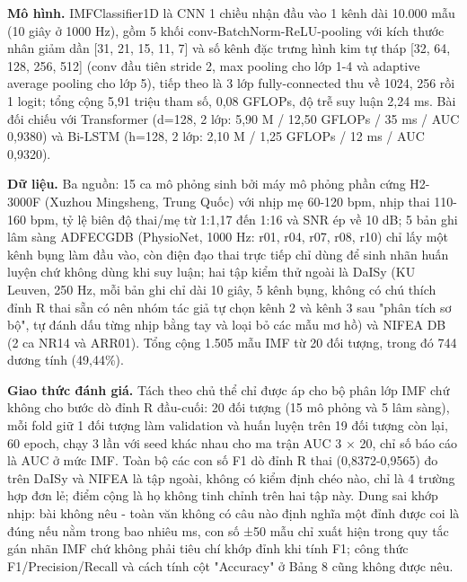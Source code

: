 \documentclass[12pt,a4paper]{article}
\begin{document}
\noindent \textbf{Mô hình.} IMFClassifier1D là CNN 1 chiều nhận đầu vào 1 kênh dài 10.000 mẫu (10 giây ở 1000 Hz), gồm 5 khối conv-BatchNorm-ReLU-pooling với kích thước nhân giảm dần [31, 21, 15, 11, 7] và số kênh đặc trưng hình kim tự tháp [32, 64, 128, 256, 512] (conv đầu tiên stride 2, max pooling cho lớp 1-4 và adaptive average pooling cho lớp 5), tiếp theo là 3 lớp fully-connected thu về 1024, 256 rồi 1 logit; tổng cộng 5,91 triệu tham số, 0,08 GFLOPs, độ trễ suy luận 2,24 ms. Bài đối chiếu với Transformer (d=128, 2 lớp: 5,90 M / 12,50 GFLOPs / 35 ms / AUC 0,9380) và Bi-LSTM (h=128, 2 lớp: 2,10 M / 1,25 GFLOPs / 12 ms / AUC 0,9320).\par\vspace{3pt}
\noindent \textbf{Dữ liệu.} Ba nguồn: 15 ca mô phỏng sinh bởi máy mô phỏng phần cứng H2-3000F (Xuzhou Mingsheng, Trung Quốc) với nhịp mẹ 60-120 bpm, nhịp thai 110-160 bpm, tỷ lệ biên độ thai/mẹ từ 1:1,17 đến 1:16 và SNR ép về 10 dB; 5 bản ghi lâm sàng ADFECGDB (PhysioNet, 1000 Hz: r01, r04, r07, r08, r10) chỉ lấy một kênh bụng làm đầu vào, còn điện đạo thai trực tiếp chỉ dùng để sinh nhãn huấn luyện chứ không dùng khi suy luận; hai tập kiểm thử ngoài là DaISy (KU Leuven, 250 Hz, mỗi bản ghi chỉ dài 10 giây, 5 kênh bụng, không có chú thích đỉnh R thai sẵn có nên nhóm tác giả tự chọn kênh 2 và kênh 3 sau "phân tích sơ bộ", tự đánh dấu từng nhịp bằng tay và loại bỏ các mẫu mơ hồ) và NIFEA DB (2 ca NR14 và ARR01). Tổng cộng 1.505 mẫu IMF từ 20 đối tượng, trong đó 744 dương tính (49,44\%).\par\vspace{3pt}
\noindent \textbf{Giao thức đánh giá.} Tách theo chủ thể chỉ được áp cho bộ phân lớp IMF chứ không cho bước dò đỉnh R đầu-cuối: 20 đối tượng (15 mô phỏng và 5 lâm sàng), mỗi fold giữ 1 đối tượng làm validation và huấn luyện trên 19 đối tượng còn lại, 60 epoch, chạy 3 lần với seed khác nhau cho ma trận AUC 3 × 20, chỉ số báo cáo là AUC ở mức IMF. Toàn bộ các con số F1 dò đỉnh R thai (0,8372-0,9565) đo trên DaISy và NIFEA là tập ngoài, không có kiểm định chéo nào, chỉ là 4 trường hợp đơn lẻ; điểm cộng là họ không tinh chỉnh trên hai tập này. Dung sai khớp nhịp: bài không nêu - toàn văn không có câu nào định nghĩa một đỉnh được coi là đúng nếu nằm trong bao nhiêu ms, con số ±50 mẫu chỉ xuất hiện trong quy tắc gán nhãn IMF chứ không phải tiêu chí khớp đỉnh khi tính F1; công thức F1/Precision/Recall và cách tính cột "Accuracy" ở Bảng 8 cũng không được nêu.\par\vspace{3pt}
\end{document}
